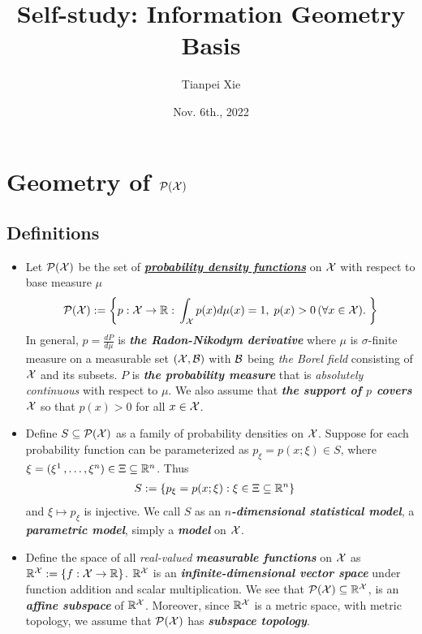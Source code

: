 \documentclass[11pt]{article}
\begin{document}
\title{Self-study: Information Geometry Basis}
\author{ Tianpei Xie}
\date{ Nov. 6th., 2022 }
\maketitle
\tableofcontents
\newpage
\section{Geometry of ${\mathcal P}({\mathcal X})$}
\subsection{Definitions}
\begin{itemize}
\item Let ${\mathcal P}({\mathcal X})$ be the set of \underline{\emph{\textbf{probability density functions}}} on ${\mathcal X}$ with respect to base measure $\mu$
\begin{align*}
{\mathcal P}({\mathcal X}) := \left\{p: {\mathcal X} \rightarrow {\mathbb R}: \, \int_{{\mathcal X}} p(x)d\mu(x) = 1,\;  p(x) > 0 \,(\forall x \in {\mathcal X}). \;  \right\}
\end{align*} In general, $p = \frac{dP}{d\mu}$ is \emph{\textbf{the Radon-Nikodym derivative}} where $\mu$ is $\sigma$-finite measure on a measurable set $({\mathcal X}, {\mathcal B})$ with ${\mathcal B}$ being \emph{the Borel field} consisting of ${\mathcal X}$ and its subsets. $P$ is \emph{\textbf{the probability measure}} that is \emph{absolutely continuous} with respect to $\mu$. We also assume that \emph{\textbf{the support of $p$ covers ${\mathcal X}$}} so that $p(x) >0$ for all $x\in {\mathcal X}$.

\item Define $S \subseteq {\mathcal P}({\mathcal X})$ as a family of probability densities on ${\mathcal X}$. Suppose for each probability function can be parameterized as $p_{\xi} = p(x; \xi) \in S$, where $\xi = (\xi^1 \,{,}\ldots{,}\, \xi^n) \in \Xi \subseteq {\mathbb R}^n$. Thus 
\begin{align*}
S &:= \left\{p_{\xi} = p(x; \xi): \xi \in \Xi  \subseteq {\mathbb R}^n \right\}
\end{align*} and $\xi \mapsto p_{\xi}$ is injective. We call $S$ as an \emph{\textbf{$n$-dimensional statistical model}}, a \emph{\textbf{parametric model}}, simply a \emph{\textbf{model}} on ${\mathcal X}$.

\item Define the space of all \emph{real-valued \textbf{measurable functions}} on ${\mathcal X}$ as ${\mathbb R}^{{\mathcal X}} := \left\{f: {\mathcal X}\rightarrow {\mathbb R}\right\}$. ${\mathbb R}^{{\mathcal X}}$ is an \textbf{\emph{infinite-dimensional vector space}} under function addition and scalar multiplication. We see that ${\mathcal P}({\mathcal X}) \subseteq {\mathbb R}^{{\mathcal X}}$, is an  \emph{\textbf{affine subspace}} of ${\mathbb R}^{{\mathcal X}}$. Moreover, since ${\mathbb R}^{{\mathcal X}}$ is a metric space, with metric topology, we assume that ${\mathcal P}({\mathcal X})$ has \emph{\textbf{subspace topology}}.


\end{itemize}
\end{document}
